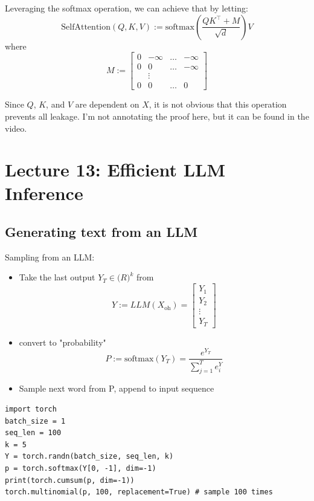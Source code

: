 \documentclass{article}
\begin{document}
\begin{itemize}
    \items Leveraging the softmax operation, we can achieve that by letting:
        $$\mathrm{SelfAttention}(Q, K, V) := \mathrm{softmax}\left(\frac{QK^\intercal + M}{\sqrt{d}}\right)V$$
        where
        $$M := \begin{bmatrix}
            0 & -\infty & \dots & -\infty \\
            0 &       0 & \dots & -\infty \\
            &\vdots&&\\
            0 &       0 & \dots & 0
        \end{bmatrix}$$

    \items Since $Q$, $K$, and $V$ are dependent on $X$, it is not obvious that this operation prevents all leakage. I'm not annotating the proof here, but it can be found in the video.
\end{itemize}







\section*{Lecture 13: Efficient LLM Inference}

\subsection*{Generating text from an LLM}
Sampling from an LLM:
\begin{itemize}
\item Take the last output $Y_T \in\mathbf(R)^k$ from
$$Y:=LLM(X_\mathrm{oh})=\begin{bmatrix}
Y_1 \\ Y_2 \\ \vdots \\ Y_T
\end{bmatrix}$$

\item convert to "probability"
$$P:=\mathrm{softmax}(Y_T)=\frac{e^{Y_T}}{\sum_{j=1}^T e^Y_i}$$

\item Sample next word from P, append to input sequence
\end{itemize}

\begin{verbatim}
import torch
batch_size = 1
seq_len = 100
k = 5
Y = torch.randn(batch_size, seq_len, k)
p = torch.softmax(Y[0, -1], dim=-1)
print(torch.cumsum(p, dim=-1))
torch.multinomial(p, 100, replacement=True) # sample 100 times
\end{verbatim}
\end{document}
